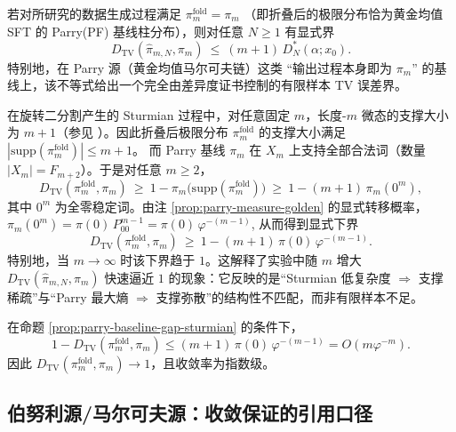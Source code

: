 \begin{corollary}\label{cor:tv-to-parry-when-gap-zero}
若对所研究的数据生成过程满足
\(
\pi_m^{\mathrm{fold}}=\pi_m
\)
（即折叠后的极限分布恰为黄金均值 SFT 的 Parry(PF) 基线柱分布），则对任意 $N\ge 1$ 有显式界
\[
D_{\mathrm{TV}}(\hat{\pi}_{m,N},\pi_m)\ \le\ (m+1)\,D_N^*(\alpha;x_0).
\]
特别地，在 Parry 源（黄金均值马尔可夫链）这类 ``输出过程本身即为 $\pi_m$'' 的基线上，该不等式给出一个完全由差异度证书控制的有限样本 TV 误差界。
\end{corollary}

\begin{proposition}\label{prop:parry-baseline-gap-sturmian}
在旋转二分割产生的 Sturmian 过程中，对任意固定 $m$，长度-$m$ 微态的支撑大小为 $m+1$（参见 \cite{MorseHedlund1940,LindMarcus1995}）。因此折叠后极限分布 $\pi_m^{\mathrm{fold}}$ 的支撑大小满足
\(
|\mathrm{supp}(\pi_m^{\mathrm{fold}})|\le m+1
\)。
而 Parry 基线 $\pi_m$ 在 $X_m$ 上支持全部合法词（数量 $|X_m|=F_{m+2}$）。于是对任意 $m\ge 2$，
\[
D_{\mathrm{TV}}(\pi_m^{\mathrm{fold}},\pi_m)\ \ge\ 1-\pi_m\bigl(\mathrm{supp}(\pi_m^{\mathrm{fold}})\bigr)
\ \ge\ 1-(m+1)\,\pi_m(0^m),
\]
其中 $0^m$ 为全零稳定词。由注 \ref{prop:parry-measure-golden} 的显式转移概率，
\(
\pi_m(0^m)=\pi(0)\,P_{00}^{m-1}=\pi(0)\,\varphi^{-(m-1)}
\),
从而得到显式下界
\[
D_{\mathrm{TV}}(\pi_m^{\mathrm{fold}},\pi_m)\ \ge\ 1-(m+1)\,\pi(0)\,\varphi^{-(m-1)}.
\]
特别地，当 $m\to\infty$ 时该下界趋于 $1$。这解释了实验中随 $m$ 增大 $D_{\mathrm{TV}}(\hat{\pi}_{m,N},\pi_m)$ 快速逼近 $1$ 的现象：它反映的是“Sturmian 低复杂度 $\Rightarrow$ 支撑稀疏”与“Parry 最大熵 $\Rightarrow$ 支撑弥散”的结构性不匹配，而非有限样本不足。
\end{proposition}

\begin{corollary}\label{cor:parry-gap-exp}
在命题 \ref{prop:parry-baseline-gap-sturmian} 的条件下，
\[
1-D_{\mathrm{TV}}(\pi_m^{\mathrm{fold}},\pi_m)
\le (m+1)\,\pi(0)\,\varphi^{-(m-1)}
=O(m\varphi^{-m}).
\]
因此 $D_{\mathrm{TV}}(\pi_m^{\mathrm{fold}},\pi_m)\to 1$，且收敛率为指数级。
\end{corollary}

\subsection{伯努利源/马尔可夫源：收敛保证的引用口径}

